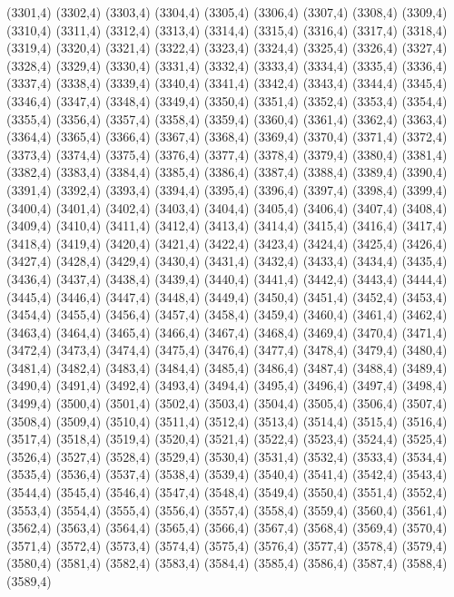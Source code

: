 (3301,4)
(3302,4)
(3303,4)
(3304,4)
(3305,4)
(3306,4)
(3307,4)
(3308,4)
(3309,4)
(3310,4)
(3311,4)
(3312,4)
(3313,4)
(3314,4)
(3315,4)
(3316,4)
(3317,4)
(3318,4)
(3319,4)
(3320,4)
(3321,4)
(3322,4)
(3323,4)
(3324,4)
(3325,4)
(3326,4)
(3327,4)
(3328,4)
(3329,4)
(3330,4)
(3331,4)
(3332,4)
(3333,4)
(3334,4)
(3335,4)
(3336,4)
(3337,4)
(3338,4)
(3339,4)
(3340,4)
(3341,4)
(3342,4)
(3343,4)
(3344,4)
(3345,4)
(3346,4)
(3347,4)
(3348,4)
(3349,4)
(3350,4)
(3351,4)
(3352,4)
(3353,4)
(3354,4)
(3355,4)
(3356,4)
(3357,4)
(3358,4)
(3359,4)
(3360,4)
(3361,4)
(3362,4)
(3363,4)
(3364,4)
(3365,4)
(3366,4)
(3367,4)
(3368,4)
(3369,4)
(3370,4)
(3371,4)
(3372,4)
(3373,4)
(3374,4)
(3375,4)
(3376,4)
(3377,4)
(3378,4)
(3379,4)
(3380,4)
(3381,4)
(3382,4)
(3383,4)
(3384,4)
(3385,4)
(3386,4)
(3387,4)
(3388,4)
(3389,4)
(3390,4)
(3391,4)
(3392,4)
(3393,4)
(3394,4)
(3395,4)
(3396,4)
(3397,4)
(3398,4)
(3399,4)
(3400,4)
(3401,4)
(3402,4)
(3403,4)
(3404,4)
(3405,4)
(3406,4)
(3407,4)
(3408,4)
(3409,4)
(3410,4)
(3411,4)
(3412,4)
(3413,4)
(3414,4)
(3415,4)
(3416,4)
(3417,4)
(3418,4)
(3419,4)
(3420,4)
(3421,4)
(3422,4)
(3423,4)
(3424,4)
(3425,4)
(3426,4)
(3427,4)
(3428,4)
(3429,4)
(3430,4)
(3431,4)
(3432,4)
(3433,4)
(3434,4)
(3435,4)
(3436,4)
(3437,4)
(3438,4)
(3439,4)
(3440,4)
(3441,4)
(3442,4)
(3443,4)
(3444,4)
(3445,4)
(3446,4)
(3447,4)
(3448,4)
(3449,4)
(3450,4)
(3451,4)
(3452,4)
(3453,4)
(3454,4)
(3455,4)
(3456,4)
(3457,4)
(3458,4)
(3459,4)
(3460,4)
(3461,4)
(3462,4)
(3463,4)
(3464,4)
(3465,4)
(3466,4)
(3467,4)
(3468,4)
(3469,4)
(3470,4)
(3471,4)
(3472,4)
(3473,4)
(3474,4)
(3475,4)
(3476,4)
(3477,4)
(3478,4)
(3479,4)
(3480,4)
(3481,4)
(3482,4)
(3483,4)
(3484,4)
(3485,4)
(3486,4)
(3487,4)
(3488,4)
(3489,4)
(3490,4)
(3491,4)
(3492,4)
(3493,4)
(3494,4)
(3495,4)
(3496,4)
(3497,4)
(3498,4)
(3499,4)
(3500,4)
(3501,4)
(3502,4)
(3503,4)
(3504,4)
(3505,4)
(3506,4)
(3507,4)
(3508,4)
(3509,4)
(3510,4)
(3511,4)
(3512,4)
(3513,4)
(3514,4)
(3515,4)
(3516,4)
(3517,4)
(3518,4)
(3519,4)
(3520,4)
(3521,4)
(3522,4)
(3523,4)
(3524,4)
(3525,4)
(3526,4)
(3527,4)
(3528,4)
(3529,4)
(3530,4)
(3531,4)
(3532,4)
(3533,4)
(3534,4)
(3535,4)
(3536,4)
(3537,4)
(3538,4)
(3539,4)
(3540,4)
(3541,4)
(3542,4)
(3543,4)
(3544,4)
(3545,4)
(3546,4)
(3547,4)
(3548,4)
(3549,4)
(3550,4)
(3551,4)
(3552,4)
(3553,4)
(3554,4)
(3555,4)
(3556,4)
(3557,4)
(3558,4)
(3559,4)
(3560,4)
(3561,4)
(3562,4)
(3563,4)
(3564,4)
(3565,4)
(3566,4)
(3567,4)
(3568,4)
(3569,4)
(3570,4)
(3571,4)
(3572,4)
(3573,4)
(3574,4)
(3575,4)
(3576,4)
(3577,4)
(3578,4)
(3579,4)
(3580,4)
(3581,4)
(3582,4)
(3583,4)
(3584,4)
(3585,4)
(3586,4)
(3587,4)
(3588,4)
(3589,4)
